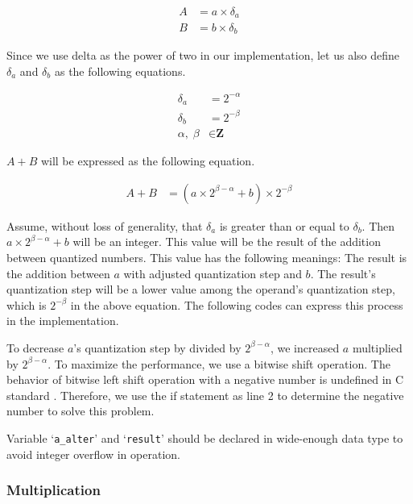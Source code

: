 \begin{align*}
  A &= a \times \delta_a \\
  B &= b \times \delta_b
\end{align*}

 Since we use delta as the power of two in our implementation, let us also define $\delta_a$ and $\delta_b$ as the following equations.

\begin{align*}
  \delta_a & = 2 ^{-\alpha} \\
  \delta_b & = 2^{-\beta} \\
  \alpha,\; \beta & \in \textbf{Z}
\end{align*}

$A + B$ will be expressed as the following equation.

\begin{align*}
  A + B &= (a \times 2^{\beta - \alpha} + b) \times 2^{-\beta}
\end{align*}

Assume, without loss of generality, that $\delta_a$ is greater than or equal to $\delta_b$. Then $a \times 2^{\beta - \alpha} + b$ will be an integer. This value will be the result of the addition between quantized numbers. This value has the following meanings: The result is the addition between $a$ with adjusted quantization step and $b$. The result's quantization step will be a lower value among the operand's quantization step, which is $2^{-\beta}$ in the above equation. The following codes can express this process in the implementation.

\begin{quote}
  
\end{quote}

To decrease $a$'s quantization step by divided by $2^{\beta - \alpha}$, we increased $a$ multiplied by $2^{\beta - \alpha}$. To maximize the performance, we use a bitwise shift operation. The behavior of bitwise left shift operation with a negative number is undefined in C standard \cite{iso:c17}. Therefore, we use the if statement as line 2 to determine the negative number to solve this problem.

Variable `\texttt{a\_alter}' and `\texttt{result}' should be declared in wide-enough data type to avoid integer overflow in operation.

\subsubsection{Multiplication}

